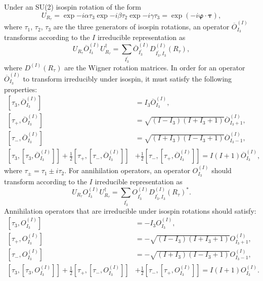    Under an SU(2) isospin rotation of the form
    \begin{equation}
        U_{R_{\tau}}=\exp{-i\alpha\tau_3}\exp{-i\beta\tau_2}\exp{-i\gamma\tau_3} = \exp (-i \boldsymbol{\varphi} \cdot \boldsymbol{\tau}),
    \end{equation}
    where $\tau_1$, $\tau_2$, $\tau_3$ are the three generators of isospin rotations,
    an operator $\overline O_{I_3}^{(I)}$ transforms according to the $I$ irreducible representation as
    \begin{equation}
        U_{R_{\tau}}\overline O_{I_3}^{(I)}U_{R_{\tau}}^\dagger = \sum_{I_3^\prime} \overline O_{I_3^\prime}^{(I)} D^{(I)}_{I_3^\prime, I_3}(R_\tau),
    \end{equation}
    where $D^{(I)}(R_\tau)$ are the Wigner rotation matrices. In order for an operator $\overline O_{I_3}^{(I)}$ to transform irreducibly under isospin, it must satisfy the following properties:
    \begin{align}
        \left[\tau_3, \overline O_{I_3}^{(I)}\right] &= I_3 \overline O_{I_3}^{(I)}, \\
        \left[\tau_+, \overline O_{I_3}^{(I)}\right] &= \sqrt{(I - I_3)(I + I_3 + 1)} \overline O_{I_3 + 1}^{(I)}, \\
        \left[\tau_-, \overline O_{I_3}^{(I)}\right] &= \sqrt{(I + I_3)(I - I_3 + 1)} \overline O_{I_3 - 1}^{(I)}, \\
        \left[\tau_3, \left[\tau_3, \overline O_{I_3}^{(I)}\right] \right] + \frac{1}{2} \left[\tau_+, \left[\tau_-, \overline O_{I_3}^{(I)}\right]\right] &+ \frac{1}{2}\left[\tau_-, \left[\tau_+, \overline O_{I_3}^{(I)}\right]\right] = I(I + 1) \overline O_{I_3}^{(I)},
    \end{align}
    where $\tau_\pm = \tau_1 \pm i\tau_2$. For annihilation operators, an operator $O_{I_3}^{(I)}$ should transform according to the $I$ irreducible representation as
    \begin{equation}
        U_{R_{\tau}}O_{I_3}^{(I)}U_{R_{\tau}}^\dagger = \sum_{I_3^\prime} O_{I_3^\prime}^{(I)} D^{(I)}_{I_3^\prime, I_3}(R_\tau)^*.
    \end{equation}
    Annihilation operators that are irreducible under isospin rotations should satisfy:
    \begin{align}
        \left[\tau_3, O_{I_3}^{(I)}\right] &= -I_3 O_{I_3}^{(I)}, \\
        \left[\tau_+, O_{I_3}^{(I)}\right] &= -\sqrt{(I - I_3)(I + I_3 + 1)} O_{I_3 + 1}^{(I)}, \\
        \left[\tau_-, O_{I_3}^{(I)}\right] &= -\sqrt{(I + I_3)(I - I_3 + 1)} O_{I_3 - 1}^{(I)}, \\
        \left[\tau_3, \left[\tau_3, O_{I_3}^{(I)}\right] \right] + \frac{1}{2} \left[\tau_+, \left[\tau_-, O_{I_3}^{(I)}\right]\right] &+ \frac{1}{2}\left[\tau_-, \left[\tau_+, O_{I_3}^{(I)}\right]\right] = I(I + 1)  O_{I_3}^{(I)}.
    \end{align}
